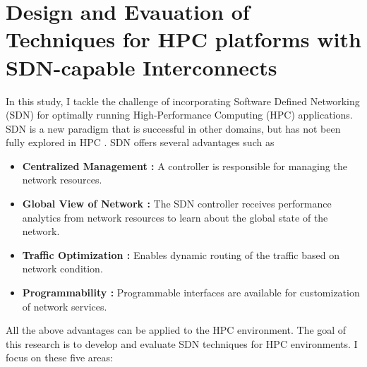 \chapter{Design and Evauation of Techniques for HPC platforms with SDN-capable Interconnects} In
this study, I tackle the challenge of incorporating Software Defined
Networking (SDN) for optimally running High-Performance Computing (HPC)
applications. SDN is a new paradigm that is successful in other domains, but has not
been fully explored in HPC \cite{kreutz2014software, alalmaei2020sdn, he2016firebird}. 
SDN offers several advantages such as
\begin{itemize}

\item \textbf{Centralized Management :} A controller is responsible for managing the network resources.
\item \textbf{Global View of Network :} The SDN controller receives performance analytics from network resources to learn about the global state of the network.
\item \textbf{Traffic Optimization :} Enables dynamic routing of the traffic based on network condition.
\item \textbf{Programmability :} Programmable interfaces are available for customization of network services.

\end{itemize}
All the above advantages can be applied to the HPC environment. 
The goal of this research is to develop and
evaluate SDN techniques for HPC environments. I focus on these five areas:


\begin{comment}
This work attempts to accomplish the following objectives:
\begin{itemize}
\item To have an network API,
allowing users to indicate whether a communication is an elephant flow or not. This
would release the network system from classifying such flows.

\item To create routing algorithm which can be implemented inside a
SDN controller, these routing functions help to load balance the network traffic
by efficiently scheduling the bandwidth heavy elephant flows which are classfied by the API.


\item To run a thorough simulation based evaluation of the techinques developed
in different node to rank mapping configurations.
\end{itemize}

The following sections propose the details of flow identication, SDN-enabled flow scheduling, topology and job mappings in this project.
\end{comment}

